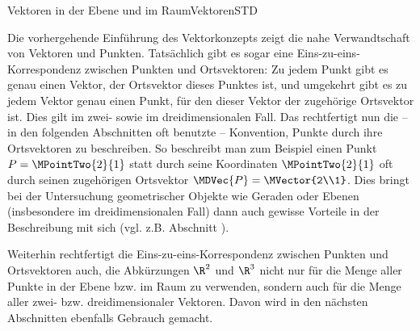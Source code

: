 \begin{MXContent}{Vektoren in der Ebene und im Raum}{Vektoren}{STD}
\begin{MExercise}
\begin{MHint}{\iSolution}
\begin{itemize}
\begin{center}
\end{center}

\end{itemize}

\end{MHint}

\end{MExercise}

Die vorhergehende Einführung des Vektorkonzepts zeigt die nahe Verwandtschaft von Vektoren und Punkten. Tatsächlich gibt es
sogar eine Eins-zu-eins-Korrespondenz zwischen Punkten und Ortsvektoren: Zu jedem Punkt gibt es genau einen Vektor, der Ortsvektor
dieses Punktes ist, und umgekehrt gibt es zu jedem Vektor genau einen Punkt, für den dieser Vektor der zugehörige Ortsvektor ist.
Dies gilt im zwei- sowie im dreidimensionalen Fall. Das rechtfertigt nun die -- in den folgenden Abschnitten oft benutzte -- Konvention,
Punkte durch ihre Ortsvektoren zu beschreiben. So beschreibt man zum Beispiel einen Punkt $P=\MPointTwo{2}{1}$ statt durch seine
Koordinaten $\MPointTwo{2}{1}$ oft durch seinen zugehörigen Ortsvektor $\MDVec{P}=\MVector{2\\1}$. Dies bringt bei der Untersuchung
geometrischer Objekte wie Geraden oder Ebenen (insbesondere im dreidimensionalen Fall) dann auch gewisse Vorteile in der Beschreibung
mit sich (vgl. z.B.  Abschnitt ).   

Weiterhin rechtfertigt die Eins-zu-eins-Korrespondenz zwischen Punkten und Ortsvektoren auch, die Abkürzungen $\R^2$ und $\R^3$ nicht nur für die Menge aller Punkte in der Ebene bzw. im Raum zu verwenden, sondern auch für die Menge aller zwei- bzw. dreidimensionaler Vektoren. Davon wird in den nächsten Abschnitten ebenfalls Gebrauch gemacht.

\end{MXContent}

